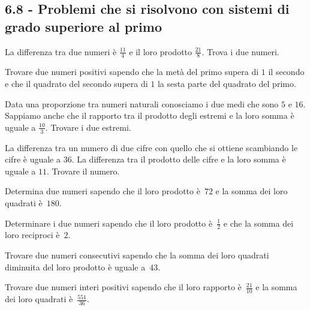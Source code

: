 \subsection*{6.8 - Problemi che si risolvono con sistemi di grado superiore al primo}
\begin{multicols}{2}
\begin{esercizio}[\Ast]
 \label{ese:6.63}
La differenza tra due numeri è $\frac {11} 4$ e il loro prodotto $\frac {21} 8$. Trova i due numeri.
\end{esercizio}

\begin{esercizio}[\Ast]
 \label{ese:6.64}
Trovare due numeri positivi sapendo che la metà del primo supera di $ 1 $ il secondo e che il quadrato del secondo supera di $ 1 $ la sesta parte del quadrato del primo.
\end{esercizio}

\begin{esercizio}[\Ast]
 \label{ese:6.65}
Data una proporzione tra numeri naturali conosciamo i due medi che sono $ 5 $ e $ 16 $. Sappiamo anche che il rapporto tra il prodotto degli estremi e la loro somma è uguale a $\frac {10} 3 $. Trovare i due estremi.
\end{esercizio}

\begin{esercizio}[\Ast]
 \label{ese:6.66}
La differenza tra un numero di due cifre con quello che si ottiene scambiando le cifre è uguale a $ 36 $. La differenza tra il prodotto delle cifre e la loro somma è uguale a $ 11 $. Trovare il numero.
\end{esercizio}

\begin{esercizio}[\Ast]
 \label{ese:6.67}
Determina due numeri sapendo che il loro prodotto è~$72$ e la somma dei loro quadrati è~$180$.
\end{esercizio}

\begin{esercizio}[\Ast]
 \label{ese:6.68}
Determinare i due numeri sapendo che il loro prodotto è~$\frac{1}{2}$ e che la somma dei loro reciproci è~$2$.
\end{esercizio}

\begin{esercizio}[\Ast]
 \label{ese:6.69}
Trovare due numeri consecutivi sapendo che la somma dei loro quadrati diminuita del loro prodotto è uguale a~$43$.
\end{esercizio}

\begin{esercizio}[\Ast]
 \label{ese:6.70}
Trovare due numeri interi positivi sapendo che il loro rapporto è~$\frac{21}{10}$ e la somma dei loro quadrati è~$\frac{551}{36}$.
\end{esercizio}


\end{multicols}
